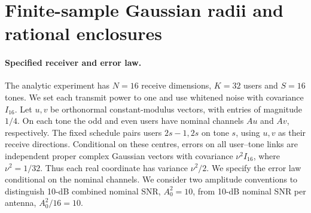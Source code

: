 \section{Finite-sample Gaussian radii and rational enclosures}
\label{supp:note2}

\paragraph{Specified receiver and error law.}
The analytic experiment has \(N=16\) receive dimensions, \(K=32\) users and \(S=16\) tones. We set each transmit power to one and use whitened noise with covariance \(I_{16}\). Let \(u,v\) be orthonormal constant-modulus vectors, with entries of magnitude \(1/4\). On each tone the odd and even users have nominal channels \(Au\) and \(Av\), respectively. The fixed schedule pairs users \(2s-1,2s\) on tone \(s\), using \(u,v\) as their receive directions. Conditional on these centres, errors on all user--tone links are independent proper complex Gaussian vectors with covariance \(\nu^2I_{16}\), where \(\nu^2=1/32\). Thus each real coordinate has variance \(\nu^2/2\). We specify the error law conditional on the nominal channels. We consider two amplitude conventions to distinguish 10-dB combined nominal SNR, \(A_0^2=10\), from 10-dB nominal SNR per antenna, \(A_0^2/16=10\).

